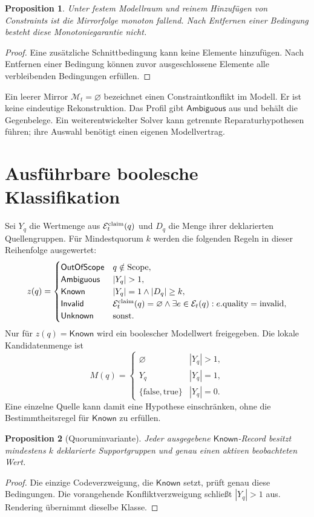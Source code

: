 \documentclass[11pt,a4paper]{article}
\newcommand{\Known}{\ensuremath{\mathsf{Known}}}
\newcommand{\Unknown}{\ensuremath{\mathsf{Unknown}}}
\newcommand{\Ambiguous}{\ensuremath{\mathsf{Ambiguous}}}
\newcommand{\Invalid}{\ensuremath{\mathsf{Invalid}}}
\newcommand{\OOS}{\ensuremath{\mathsf{OutOfScope}}}
\newcommand{\M}{\mathcal M}
\newcommand{\E}{\mathcal E}
\newcommand{\nextsection}[2]{\clearpage{\color{accent}\small\textsf{#1}}\section{#2}}
\newtheorem{proposition}{Proposition}[section]
\begin{document}
\begin{proposition}
Unter festem Modellraum und reinem Hinzufügen von Constraints
ist die Mirrorfolge monoton fallend. Nach Entfernen einer Bedingung
besteht diese Monotoniegarantie nicht.
\end{proposition}
\begin{proof}
Eine zusätzliche Schnittbedingung kann keine Elemente hinzufügen.
Nach Entfernen einer Bedingung können zuvor ausgeschlossene
Elemente alle verbleibenden Bedingungen erfüllen.
\end{proof}

Ein leerer Mirror $\M_t=\varnothing$ bezeichnet einen
Constraintkonflikt im Modell. Er ist keine eindeutige Rekonstruktion.
Das Profil gibt \Ambiguous{} aus und behält die Gegenbelege.
Ein weiterentwickelter Solver kann getrennte Reparaturhypothesen
führen; ihre Auswahl benötigt einen eigenen Modellvertrag.

\nextsection{05 / REFERENZSEMANTIK}{Ausführbare boolesche Klassifikation}
Sei $Y_q$ die Wertmenge aus $\E_t^{\rm claim}(q)$ und $D_q$ die
Menge ihrer deklarierten Quellengruppen. Für Mindestquorum $k$
werden die folgenden Regeln in dieser Reihenfolge ausgewertet:
\[
z(q)=
\begin{cases}
\OOS{} & q\notin\mathrm{Scope},\\
\Ambiguous{} & |Y_q|>1,\\
\Known{} & |Y_q|=1\land |D_q|\geq k,\\
\Invalid{} & \E_t^{\rm claim}(q)=\varnothing
\land\exists e\in\E_t(q):e.\mathrm{quality}=\mathrm{invalid},\\
\Unknown{} & \text{sonst}.
\end{cases}
\]
Nur für $z(q)=\Known$ wird ein boolescher Modellwert freigegeben.
Die lokale Kandidatenmenge ist
\[
M(q)=
\begin{cases}
\varnothing & |Y_q|>1,\\
Y_q & |Y_q|=1,\\
\{\mathrm{false},\mathrm{true}\} & |Y_q|=0.
\end{cases}
\]
Eine einzelne Quelle kann damit eine Hypothese einschränken,
ohne die Bestimmtheitsregel für \Known{} zu erfüllen.

\begin{proposition}[Quoruminvariante]
Jeder ausgegebene \Known-Record besitzt mindestens $k$ deklarierte
Supportgruppen und genau einen aktiven beobachteten Wert.
\end{proposition}
\begin{proof}
Die einzige Codeverzweigung, die \Known{} setzt, prüft genau diese
Bedingungen. Die vorangehende Konfliktverzweigung schließt
$|Y_q|>1$ aus. Rendering übernimmt dieselbe Klasse.
\end{proof}
\end{document}
